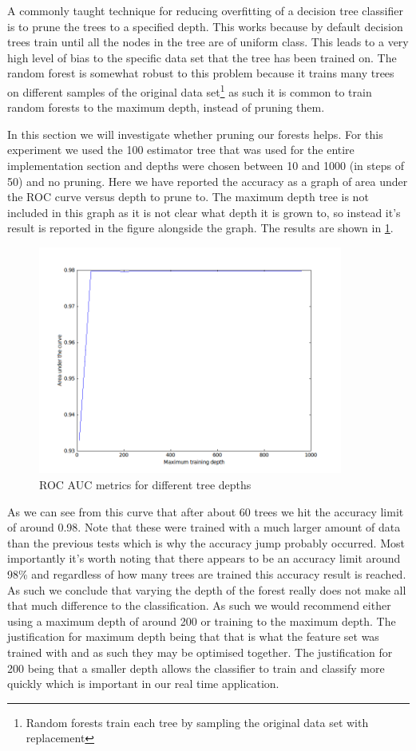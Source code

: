 \documentclass[ %
                    author={Sam Phippen},
                supervisor={Dr. Rafal Bogacz},
                     title={Real time voice activity detectors in noisy personal computing environments},
                  subtitle={},
                    degree={MEng},
                      year={2012} ]{thesis}
\begin{document}
A commonly taught technique for reducing overfitting of a decision tree
classifier is to prune the trees to a specified
depth\cite{Bramer:2002:PCT:646288.686755}. This works because by default
decision trees train until all the nodes in the tree are of uniform class. This
leads to a very high level of bias to the specific data set that the tree has
been trained on. The random forest is somewhat robust to this problem because
it trains many trees on different samples of the original data
set\footnote{Random forests train each tree by sampling the original data set
with replacement} as such it is common to train random forests to the maximum
depth, instead of pruning them.

In this section we will investigate whether pruning our forests helps. For this
experiment we used the 100 estimator tree that was used for the entire
implementation section and depths were chosen between 10 and 1000 (in steps of
50) and no pruning. Here we have reported the accuracy as a graph of area
under the ROC curve versus depth to prune to. The maximum depth tree is not
included in this graph as it is not clear what depth it is grown to, so instead
it's result is reported in the figure alongside the graph. The results are shown
in \ref{fig:roc-depths}.

\begin{figure}
    \includegraphics[width=10cm]{roc_differing_depth.png}

    \caption{ROC AUC metrics for different tree depths}
    \label{fig:roc-depths}
\end{figure}

As we can see from this curve that after about 60 trees we hit the accuracy
limit of around 0.98. Note that these were trained with a much larger amount of
data than the previous tests which is why the accuracy jump probably occurred.
Most importantly it's worth noting that there appears to be an accuracy limit
around 98\% and regardless of how many trees are trained this accuracy result
is reached. As such we conclude that varying the depth of the forest really
does not make all that much difference to the classification. As such we would
recommend either using a maximum depth of around 200 or training to the maximum
depth. The justification for maximum depth being that that is what the feature
set was trained with and as such they may be optimised together. The
justification for 200 being that a smaller depth allows the classifier to train
and classify more quickly which is important in our real time application.
\end{document}
